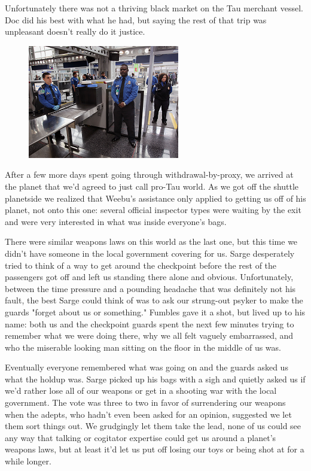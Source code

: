 Unfortunately there was not a thriving black market on the Tau merchant vessel. 
Doc did his best with what he had, but saying the rest of that trip was unpleasant doesn't really do it justice.

\begin{figure}
	\begin{center}
		\includegraphics[width=\figwidth]{pics/10/35.png}
	\end{center}
\end{figure}
After a few more days spent going through withdrawal-by-proxy, we arrived at the planet that we'd agreed to just call pro-Tau world. 
As we got off the shuttle planetside we realized that Weebu's assistance only applied to getting us off of his planet, not onto this one: 
several official inspector types were waiting by the exit and were very interested in what was inside everyone's bags.

There were similar weapons laws on this world as the last one, but this time we didn't have someone in the local government covering for us. 
Sarge desperately tried to think of a way to get around the checkpoint before the rest of the passengers got off and left us standing there alone and obvious. 
Unfortunately, between the time pressure and a pounding headache that was definitely not his fault, the best Sarge could think of was to ask our strung-out psyker to make the guards "forget about us or something." Fumbles gave it a shot, but lived up to his name: 
both us and the checkpoint guards spent the next few minutes trying to remember what we were doing there, why we all felt vaguely embarrassed, and who the miserable looking man sitting on the floor in the middle of us was.

Eventually everyone remembered what was going on and the guards asked us what the holdup was. 
Sarge picked up his bags with a sigh and quietly asked us if we'd rather lose all of our weapons or get in a shooting war with the local government. 
The vote was three to two in favor of surrendering our weapons when the adepts, who hadn't even been asked for an opinion, suggested we let them sort things out. 
We grudgingly let them take the lead, none of us could see any way that talking or cogitator expertise could get us around a planet's weapons laws, but at least it'd let us put off losing our toys or being shot at for a while longer.

